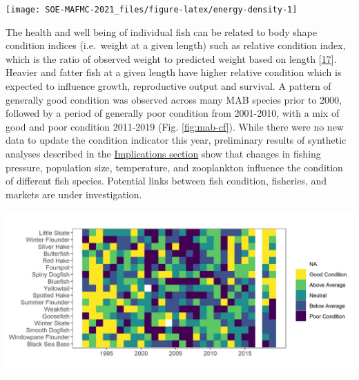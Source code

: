 \documentclass[
  10pt,
]{article}
\let\origfigure\figure
\let\endorigfigure\endfigure
\renewenvironment{figure}[1][2] {
    \expandafter\origfigure\expandafter[H]
} {
    \endorigfigure
}
\begin{document}
\begin{figure}

{\centering \texttt{[image: SOE-MAFMC-2021\_files/figure-latex/energy-density-1]} 

}

\caption{Forage fish mean energy density mean and standard deviation by season and year, compared with 1980s (Steimle and Terranove 1985) and 1990s (Lawson et al. 1998) values.}\label{fig:energy-density}
\end{figure}

The health and well being of individual fish can be related to body
shape condition indices (i.e.~weight at a given length) such as relative
condition index, which is the ratio of observed weight to predicted
weight based on length
{[}\protect\hyperlink{ref-le_cren_length-weight_1951}{17}{]}. Heavier
and fatter fish at a given length have higher relative condition which
is expected to influence growth, reproductive output and survival. A
pattern of generally good condition was observed across many MAB species
prior to 2000, followed by a period of generally poor condition from
2001-2010, with a mix of good and poor condition 2011-2019 (Fig.
\ref{fig:mab-cf}). While there were no new data to update the condition
indicator this year, preliminary results of synthetic analyses described
in the
\protect\hyperlink{environmental-drivers-of-fish-condition}{Implications
section} show that changes in fishing pressure, population size,
temperature, and zooplankton influence the condition of different fish
species. Potential links between fish condition, fisheries, and markets
are under investigation.

\begin{figure}

{\centering \includegraphics[width=1\linewidth]{images/MABcondition_2019_viridis_final} 

}

\caption{Condition factor for fish species in the MAB based on fall NEFSC bottom trawl survey data. MAB data are missing for 2017 due to survey delays, and no survey was conducted in 2020.}\label{fig:mab-cf}
\end{figure}
\end{document}
